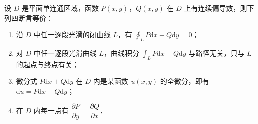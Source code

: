 \begin{theorem}\label{thm:22-4}
设 $D$ 是平面单连通区域，函数 $P(x,y)$，$Q(x,y)$ 在 $D$ 上有连续偏导数，则下列四断言等价：
\begin{enumerate}[label=（\arabic*）]
\item 沿 $D$ 中任一逐段光滑的闭曲线 $L$，有 $\displaystyle\oint_{L}P\mathrm{d}x+Q\mathrm{d}y=0$；
\item 对 $D$ 中任一逐段光滑曲线 $L$，曲线积分 $\displaystyle\int_{L}P\mathrm{d}x+Q\mathrm{d}y$ 与路径无关，只与 $L$ 的起点与终点有关；
\item 微分式 $P\mathrm{d}x+Q\mathrm{d}y$ 在 $D$ 内是某函数 $u(x,y)$ 的全微分，即有 $\mathrm{d}u=P\mathrm{d}x+Q\mathrm{d}y$；
\item 在 $D$ 内每一点有 $\dfrac{\partial P}{\partial y}=\dfrac{\partial Q}{\partial x}$．
\end{enumerate}
\end{theorem}

